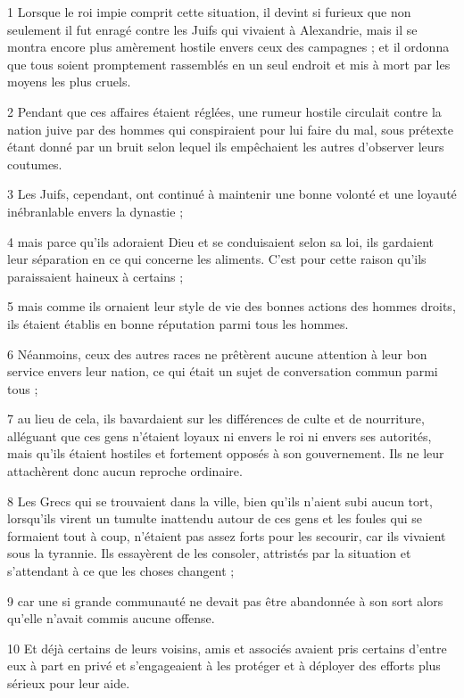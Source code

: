 \par 1 Lorsque le roi impie comprit cette situation, il devint si furieux que non seulement il fut enragé contre les Juifs qui vivaient à Alexandrie, mais il se montra encore plus amèrement hostile envers ceux des campagnes ; et il ordonna que tous soient promptement rassemblés en un seul endroit et mis à mort par les moyens les plus cruels.
\par 2 Pendant que ces affaires étaient réglées, une rumeur hostile circulait contre la nation juive par des hommes qui conspiraient pour lui faire du mal, sous prétexte étant donné par un bruit selon lequel ils empêchaient les autres d'observer leurs coutumes.
\par 3 Les Juifs, cependant, ont continué à maintenir une bonne volonté et une loyauté inébranlable envers la dynastie ;
\par 4 mais parce qu'ils adoraient Dieu et se conduisaient selon sa loi, ils gardaient leur séparation en ce qui concerne les aliments. C’est pour cette raison qu’ils paraissaient haineux à certains ;
\par 5 mais comme ils ornaient leur style de vie des bonnes actions des hommes droits, ils étaient établis en bonne réputation parmi tous les hommes.
\par 6 Néanmoins, ceux des autres races ne prêtèrent aucune attention à leur bon service envers leur nation, ce qui était un sujet de conversation commun parmi tous ;
\par 7 au lieu de cela, ils bavardaient sur les différences de culte et de nourriture, alléguant que ces gens n'étaient loyaux ni envers le roi ni envers ses autorités, mais qu'ils étaient hostiles et fortement opposés à son gouvernement. Ils ne leur attachèrent donc aucun reproche ordinaire.
\par 8 Les Grecs qui se trouvaient dans la ville, bien qu'ils n'aient subi aucun tort, lorsqu'ils virent un tumulte inattendu autour de ces gens et les foules qui se formaient tout à coup, n'étaient pas assez forts pour les secourir, car ils vivaient sous la tyrannie. Ils essayèrent de les consoler, attristés par la situation et s'attendant à ce que les choses changent ;
\par 9 car une si grande communauté ne devait pas être abandonnée à son sort alors qu'elle n'avait commis aucune offense.
\par 10 Et déjà certains de leurs voisins, amis et associés avaient pris certains d'entre eux à part en privé et s'engageaient à les protéger et à déployer des efforts plus sérieux pour leur aide.
